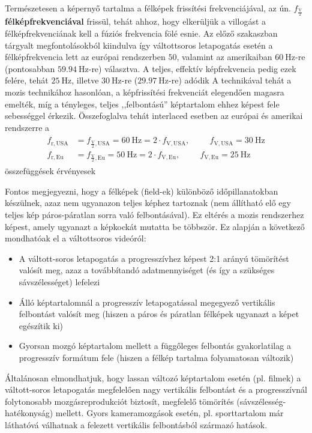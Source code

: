 Természetesen a képernyő tartalma a félképek frissítési frekvenciájával, az ún. $f_{\frac{\mathrm{V}}{2}}$\textbf{félképfrekvenciával} frissül, tehát ahhoz, hogy elkerüljük a villogást a félképfrekvenciának kell a fúziós frekvencia fölé esnie.
Az előző szakaszban tárgyalt megfontolásokból kiindulva így váltottsoros letapogatás esetén a félképfrekvencia lett az európai rendszerben $50$, valamint az amerikaiban $60~\mathrm{Hz}$-re (pontosabban $59.94~\mathrm{Hz}$-re) választva.
A teljes, effektív képfrekvencia pedig ezek felére, tehát $25~\mathrm{Hz}$, illetve $30~\mathrm{Hz}$-re ($29.97~\mathrm{Hz}$-re) adódik
A technikával tehát a mozis technikához hasonlóan, a képfrissítési frekvenciát elegendően magasra emelték, míg a tényleges, teljes ,,felbontású'' képtartalom ehhez képest fele sebességgel érkezik.
Összefoglalva tehát interlaced esetben az európai és amerikai rendszerre a 
\begin{align}
\begin{split}
f_{\mathrm{r,USA}} &= f_{\frac{\mathrm{V}}{2},\mathrm{USA}} = 60~\mathrm{Hz} = 2\cdot f_{\mathrm{V},\mathrm{USA}}, \hspace{1cm}  f_{\mathrm{V},\mathrm{USA}}= 30~\mathrm{Hz} \\
f_{\mathrm{r,Eu}} &= f_{\frac{\mathrm{V}}{2},\mathrm{Eu}} = 50~\mathrm{Hz} = 2\cdot f_{\mathrm{V},\mathrm{Eu}}, \hspace{1cm}  f_{\mathrm{V},\mathrm{Eu}}= 25~\mathrm{Hz}
\end{split}
\end{align}
összefüggések érvényesek


Fontos megjegyezni, hogy a félképek (field-ek) különböző időpillanatokban készülnek, azaz nem ugyanazon teljes képhez tartoznak (nem állítható elő egy teljes kép páros-páratlan sorra való felbontásával). 
Ez eltérés a mozis rendszerhez képest, amely ugyanazt a képkockát mutatta be többször.
Ez alapján a következő mondhatóak el a váltottsoros videóról:
\begin{itemize}
\item A váltott-soros letapogatás a progresszívhez képest 2:1 arányú tömörítést valósít meg, azaz a továbbítandó adatmennyiséget (és így a szükséges sávszélességet) lefelezi
\item Álló képtartalomnál a progresszív letapogatással megegyező vertikális felbontást valósít meg (hiszen a páros és páratlan félképek ugyanazt a képet egészítik ki)
\item Gyorsan mozgó képtartalom mellett a függőleges felbontás gyakorlatilag a progresszív formátum fele (hiszen a félkép tartalma folyamatosan változik)
\end{itemize}
Általánosan elmondhatjuk, hogy lassan változó képtartalom esetén (pl. filmek) a váltott-soros letapogatás megfelelően nagy vertikális felbontást és a progresszívnál folytonosabb mozgásreprodukciót biztosít, megfelelő tömörítés (sávszélesség-hatékonyság) mellett.
Gyors kameramozgások esetén, pl. sporttartalom már láthatóvá válhatnak a felezett vertikális felbontásból származó hatások.
\vspace{3mm}

